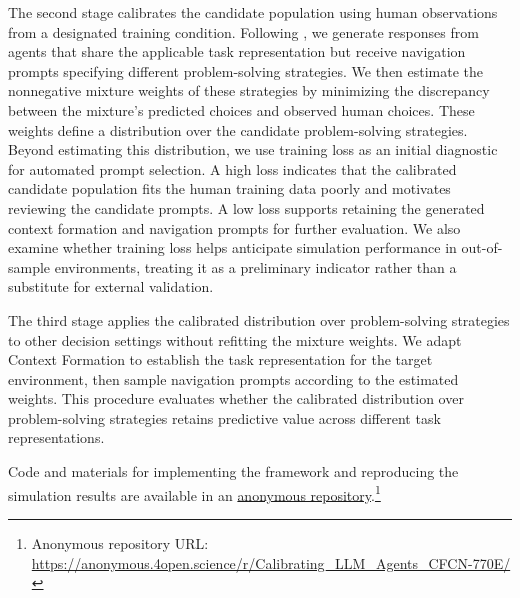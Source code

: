 \documentclass[12pt,letterpaper]{article}
\begin{document}
The second stage calibrates the candidate population using human observations from a designated training condition. Following \citet{manning2026}, we generate responses from agents that share the applicable task representation but receive navigation prompts specifying different problem-solving strategies. We then estimate the nonnegative mixture weights of these strategies by minimizing the discrepancy between the mixture's predicted choices and observed human choices. These weights define a distribution over the candidate problem-solving strategies. Beyond estimating this distribution, we use training loss as an initial diagnostic for automated prompt selection. A high loss indicates that the calibrated candidate population fits the human training data poorly and motivates reviewing the candidate prompts. A low loss supports retaining the generated context formation and navigation prompts for further evaluation. We also examine whether training loss helps anticipate simulation performance in out-of-sample environments, treating it as a preliminary indicator rather than a substitute for external validation.

The third stage applies the calibrated distribution over problem-solving strategies to other decision settings without refitting the mixture weights. We adapt Context Formation to establish the task representation for the target environment, then sample navigation prompts according to the estimated weights. This procedure evaluates whether the calibrated distribution over problem-solving strategies retains predictive value across different task representations.

Code and materials for implementing the framework and reproducing the simulation results are available in an \href{https://anonymous.4open.science/r/Calibrating_LLM_Agents_CFCN-770E/}{anonymous repository}.\footnote{Anonymous repository URL: \url{https://anonymous.4open.science/r/Calibrating_LLM_Agents_CFCN-770E/}}
\end{document}
